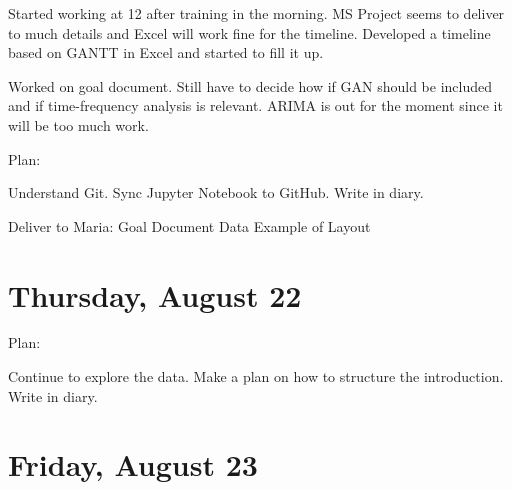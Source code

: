 \documentclass[11pt,letterpaper]{article}
\begin{document}
Started working at 12 after training in the morning. MS Project seems to deliver to much details and Excel will work fine for the timeline. Developed a timeline based on GANTT in Excel and started to fill it up.

Worked on goal document. Still have to decide how if GAN should be included and if time-frequency analysis is relevant. ARIMA is out for the moment since it will be too much work.

Plan:

Understand Git.
Sync Jupyter Notebook to GitHub.
Write in diary.

Deliver to Maria:
Goal Document
Data
Example of Layout


\section*{Thursday, August 22}

Plan:

Continue to explore the data.
Make a plan on how to structure the introduction.
Write in diary.

\section*{Friday, August 23}


\printbibliography 
\end{document}
